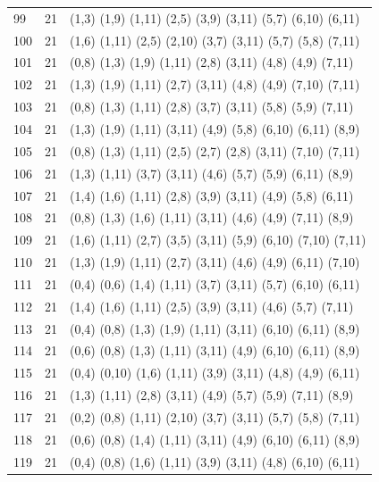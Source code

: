 \begin{appendix}
{\begin{longtable}{lll}
    99 & 21 & (1,3)   (1,9)   (1,11)  (2,5)   (3,9)   (3,11)  (5,7)   (6,10)  (6,11)\\
    100& 21 & (1,6)   (1,11)  (2,5)   (2,10)  (3,7)   (3,11)  (5,7)   (5,8)   (7,11)\\
    101& 21 & (0,8)   (1,3)   (1,9)   (1,11)  (2,8)   (3,11)  (4,8)   (4,9)   (7,11)\\
    102& 21 & (1,3)   (1,9)   (1,11)  (2,7)   (3,11)  (4,8)   (4,9)   (7,10)  (7,11)\\
    103& 21 & (0,8)   (1,3)   (1,11)  (2,8)   (3,7)   (3,11)  (5,8)   (5,9)   (7,11)\\
    104& 21 & (1,3)   (1,9)   (1,11)  (3,11)  (4,9)   (5,8)   (6,10)  (6,11)  (8,9)\\
    105& 21 & (0,8)   (1,3)   (1,11)  (2,5)   (2,7)   (2,8)   (3,11)  (7,10)  (7,11)\\
    106& 21 & (1,3)   (1,11)  (3,7)   (3,11)  (4,6)   (5,7)   (5,9)   (6,11)  (8,9)\\
    107& 21 & (1,4)   (1,6)   (1,11)  (2,8)   (3,9)   (3,11)  (4,9)   (5,8)   (6,11)\\
    108& 21 & (0,8)   (1,3)   (1,6)   (1,11)  (3,11)  (4,6)   (4,9)   (7,11)  (8,9)\\
    109& 21 & (1,6)   (1,11)  (2,7)   (3,5)   (3,11)  (5,9)   (6,10)  (7,10)  (7,11)\\
    110& 21 & (1,3)   (1,9)   (1,11)  (2,7)   (3,11)  (4,6)   (4,9)   (6,11)  (7,10)\\
    111& 21 & (0,4)   (0,6)   (1,4)   (1,11)  (3,7)   (3,11)  (5,7)   (6,10)  (6,11)\\
    112& 21 & (1,4)   (1,6)   (1,11)  (2,5)   (3,9)   (3,11)  (4,6)   (5,7)   (7,11)\\
    113& 21 & (0,4)   (0,8)   (1,3)   (1,9)   (1,11)  (3,11)  (6,10)  (6,11)  (8,9)\\
    114& 21 & (0,6)   (0,8)   (1,3)   (1,11)  (3,11)  (4,9)   (6,10)  (6,11)  (8,9)\\
    115& 21 & (0,4)   (0,10)  (1,6)   (1,11)  (3,9)   (3,11)  (4,8)   (4,9)   (6,11)\\
    116& 21 & (1,3)   (1,11)  (2,8)   (3,11)  (4,9)   (5,7)   (5,9)   (7,11)  (8,9)\\
    117& 21 & (0,2)   (0,8)   (1,11)  (2,10)  (3,7)   (3,11)  (5,7)   (5,8)   (7,11)\\
    118& 21 & (0,6)   (0,8)   (1,4)   (1,11)  (3,11)  (4,9)   (6,10)  (6,11)  (8,9)\\
    119& 21 & (0,4)   (0,8)   (1,6)   (1,11)  (3,9)   (3,11)  (4,8)   (6,10)  (6,11)\\

\end{longtable}}
\end{appendix}
